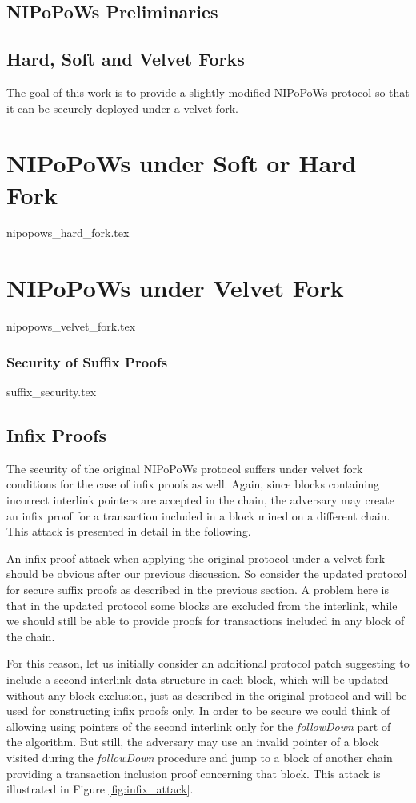 \documentclass[10pt,a4paper]{article}
\theoremstyle{plain}
\theoremstyle{definition}
\begin{document}
\subsection{NIPoPoWs Preliminaries}

\subsection{Hard, Soft and Velvet Forks}
The goal of this work is to provide a slightly modified NIPoPoWs protocol so that it can be
securely deployed under a velvet fork.
\section{NIPoPoWs under Soft or Hard Fork}
{nipopows_hard_fork.tex}

\section{NIPoPoWs under Velvet Fork}
{nipopows_velvet_fork.tex}


\subsubsection{Security of Suffix Proofs}
{suffix_security.tex}


\subsection{Infix Proofs}
The security of the original NIPoPoWs protocol suffers under velvet fork conditions for the case of
infix proofs as well. Again, since blocks containing incorrect interlink pointers are accepted in the 
chain, the adversary may create an infix proof for a transaction included in a block mined on a
different chain. This attack is presented in detail in the following.

An infix proof attack when applying the original protocol under a velvet fork should be obvious
after our previous discussion. So consider the updated protocol for secure suffix proofs as
described in the previous section. A problem here is that in the updated protocol some blocks
are excluded from the interlink, while we should still be able to provide proofs for transactions
included in any block of the chain.

For this reason, let us initially consider an additional protocol patch suggesting to include
a second interlink data structure in each block, which will be updated without any block exclusion,
just as described in the original protocol and will be used for constructing infix proofs only. In
order to be secure we could think of allowing using pointers of the second interlink only for the
\textit{followDown} part of the algorithm. But still, the adversary may use an invalid pointer of a
block visited during the \textit{followDown} procedure and jump to a block of another chain providing 
a transaction inclusion proof concerning that block. This attack is illustrated in
Figure \ref{fig:infix_attack}.
\end{document}
